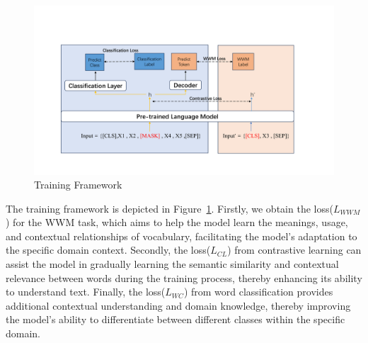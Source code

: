\begin{figure}[ht]
	\centering
	\includegraphics[width=1.0\textwidth]{train_framework} 
	\caption{Training Framework}
	\label{train}
\end{figure}

The training framework is depicted in Figure~\ref{train}. Firstly, we obtain the loss(\(L_{WWM}\)) for the WWM task, which aims to help the model learn the meanings, usage, and contextual relationships of vocabulary, facilitating the model's adaptation to the specific domain context. Secondly, the loss(\(L_{CL}\)) from contrastive learning can assist the model in gradually learning the semantic similarity and contextual relevance between words during the training process, thereby enhancing its ability to understand text. Finally, the loss(\(L_{WC}\)) from word classification provides additional contextual understanding and domain knowledge, thereby improving the model's ability to differentiate between different classes within the specific domain.


